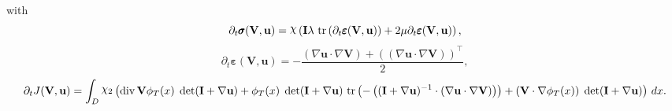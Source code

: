 \documentclass[preview]{standalone}
\let\oldcdot\cdot
\let\cdot\oldcdot
\begin{document}
with
\begin{dmath*}
\partial_{t} \pmb \sigma({\mathbf V},{\mathbf{ u }}) = \raisebox{\depth}{$\chi$} \left(\mathbf{I} \lambda  \,\operatorname{tr}\left(\partial_{t} \pmb \varepsilon({\mathbf V},{\mathbf{ u }})\right)  + 2 \mu \partial_{t} \pmb \varepsilon({\mathbf V},{\mathbf{ u }})\right),
 \end{dmath*}
\begin{dmath*}
\partial_{t} \pmb \varepsilon({\mathbf V},{\mathbf{ u }}) = - \frac{\left(  \nabla {\mathbf{ u }}  \cdot  \nabla {\mathbf V}  \right) +  \left( \left(  \nabla {\mathbf{ u }}  \cdot  \nabla {\mathbf V}  \right) \right)^\top }{2},
 \end{dmath*}
\begin{dmath*}
\partial_{t} J({\mathbf V},{\mathbf{ u }}) =  \int_{D} \raisebox{\depth}{$\chi_2$} \left(\operatorname{div} {\mathbf V} \phi_{T}(x)  \;\operatorname{det}(\mathbf{I} +  \nabla {\mathbf{ u }} )  + \phi_{T}(x)  \;\operatorname{det}(\mathbf{I} +  \nabla {\mathbf{ u }} )   \,\operatorname{tr}\left(- \left(  (\mathbf{I} +  \nabla {\mathbf{ u }} )^{-1}  \cdot \left(  \nabla {\mathbf{ u }}  \cdot  \nabla {\mathbf V}  \right) \right)\right)  + \left( {\mathbf V} \cdot  \nabla \phi_{T}(x)  \right)  \;\operatorname{det}(\mathbf{I} +  \nabla {\mathbf{ u }} ) \right) \,dx.
 \end{dmath*}
\end{document}

